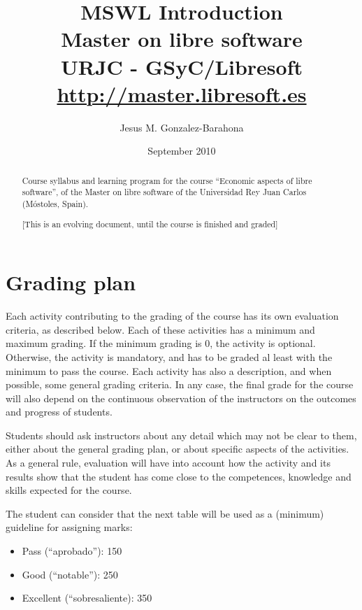 \documentclass[a4paper]{article}
\title{MSWL Introduction \\
Master on libre software \\
URJC - GSyC/Libresoft \\
\url{http://master.libresoft.es}}
\author{Jesus M. Gonzalez-Barahona}
\date{September 2010}
\begin{document}
\maketitle

\begin{abstract}
Course syllabus and learning program for the course ``Economic aspects of libre software'', of the Master on libre software of the Universidad Rey Juan Carlos (Móstoles, Spain).

[This is an evolving document, until the course is finished and graded]
\end{abstract}

\tableofcontents

\section{Grading plan}

Each activity contributing to the grading of the course has its own evaluation criteria, as described below. Each of these activities has a minimum and maximum grading. If the minimum grading is 0, the activity is optional. Otherwise, the activity is mandatory, and has to be graded al least with the minimum to pass the course. Each activity has also a description, and when possible, some general grading criteria. In any case, the final grade for the course will also depend on the continuous observation of the instructors on the outcomes and progress of students.

Students should ask instructors about any detail which may not be clear to them, either about the general grading plan, or about specific aspects of the activities. As a general rule, evaluation will have into account how the activity and its results show that the student has come close to the competences, knowledge and skills expected for the course.

The student can consider that the next table will be used as a (minimum) guideline for assigning marks:

\begin{itemize}
\item Pass (``aprobado''): 150
\item Good (``notable''): 250
\item Excellent (``sobresaliente): 350
\end{itemize}
\end{document}

